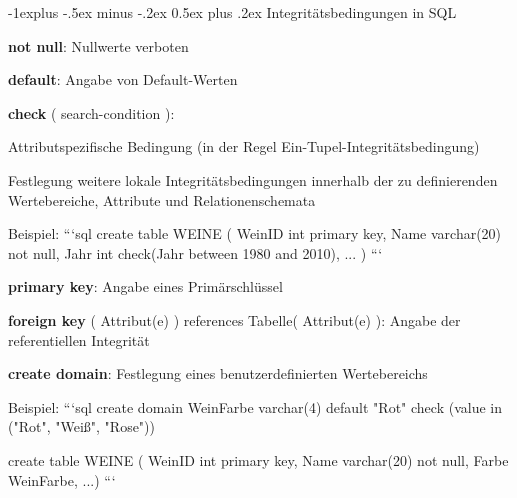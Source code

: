 \documentclass[a4paper]{article}
\makeatletter
\renewcommand{\subsection}{\@startsection{subsection}{2}{0mm}%
                                {-1explus -.5ex minus -.2ex}%
                                {0.5ex plus .2ex}%
                                {\normalfont\normalsize\bfseries}}
\makeatother
\begin{document}
\begin{multicols}{3}
\begin{itemize*}
        \subsection{Integritätsbedingungen in SQL}
        \begin{itemize*}
            \item \textbf{not null}: Nullwerte verboten
            \item \textbf{default}: Angabe von Default-Werten
            \item \textbf{check} ( search-condition ):
            \begin{itemize*}
                \item Attributspezifische Bedingung (in der Regel Ein-Tupel-Integritätsbedingung)
                \item Festlegung weitere lokale Integritätsbedingungen innerhalb der zu definierenden Wertebereiche, Attribute und Relationenschemata
                \item Beispiel:
                ```sql
                create table WEINE (
                WeinID int primary key,
                Name varchar(20) not null,
                Jahr int check(Jahr between 1980 and 2010),
                ...
                )
                ```
            \end{itemize*}
            \item \textbf{primary key}: Angabe eines Primärschlüssel
            \item \textbf{foreign key} ( Attribut(e) ) references Tabelle( Attribut(e) ): Angabe der referentiellen Integrität
            \item \textbf{create domain}: Festlegung eines benutzerdefinierten Wertebereichs
            \begin{itemize*}
                \item Beispiel:
                ```sql
                create domain WeinFarbe varchar(4)
                default "Rot"
                check (value in ("Rot", "Weiß", "Rose"))

                create table WEINE ( WeinID int primary key, Name varchar(20) not null, Farbe WeinFarbe, ...)
                ```
            \end{itemize*}
        \end{itemize*}


\end{itemize*}
\end{multicols}
\end{document}
